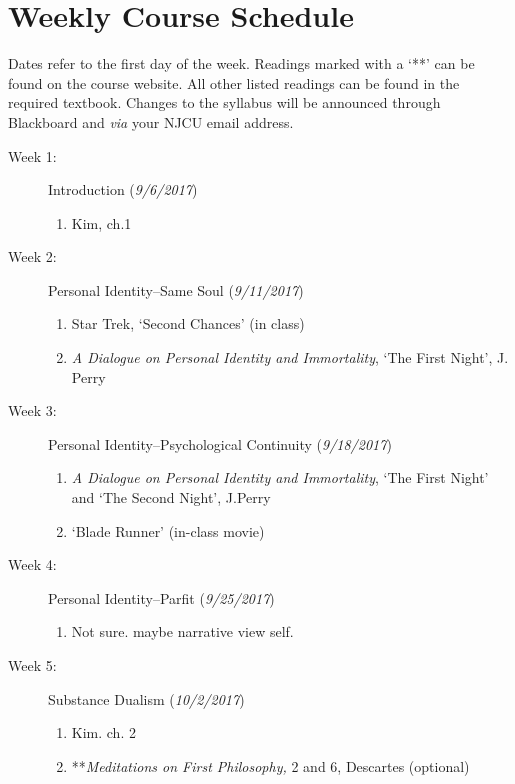 \documentclass[article,oneside]{memoir}
\begin{document}
\section{Weekly Course Schedule}
Dates refer to the first day of the week. Readings marked with a `**' can be found on the course website. All other listed readings can be found in the required textbook. Changes to the syllabus will be announced through Blackboard and \emph{via} your NJCU email address. \newline





\begin{description}

\item[Week 1: ] Introduction (\emph{9/6/2017})
\begin{enumerate}
\item Kim, ch.1
\end{enumerate}

\item[Week 2:]  Personal Identity--Same Soul (\emph{9/11/2017})
\begin{enumerate}
\item Star Trek, `Second Chances' (in class)  
\item \emph{A Dialogue on Personal Identity and Immortality}, `The First Night', J. Perry  
\end{enumerate}


\item[Week 3: ] Personal Identity--Psychological Continuity (\emph{9/18/2017})
\begin{enumerate}
\item \emph{A Dialogue on Personal Identity and Immortality}, `The First Night' and `The Second Night', J.Perry
\item `Blade Runner' (in-class movie)
\end{enumerate}


\item[Week 4: ] Personal Identity--Parfit (\emph{9/25/2017})
\begin{enumerate}
\item Not sure. maybe narrative view self. 
\end{enumerate}

\item[Week 5:] Substance Dualism (\emph{10/2/2017})
\begin{enumerate}
\item Kim. ch. 2
\item**\emph{Meditations on First Philosophy,} 2 and 6, Descartes (optional)
\end{enumerate}


\end{description}
\end{document}
